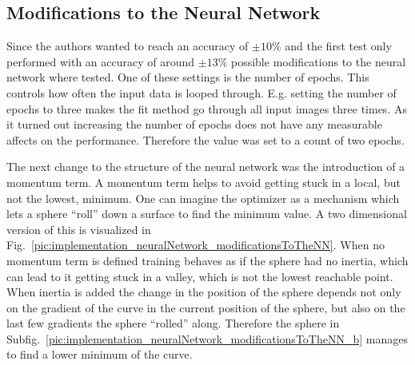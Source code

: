 \newpage

\subsection{Modifications to the Neural Network}
Since the authors wanted to reach an accuracy of $\pm 10\%$ and the first test only performed with an accuracy of around $\pm 13\%$ possible modifications to the neural network where tested. One of these settings is the number of epochs. This controls how often the input data is looped through. E.g. setting the number of epochs to three makes the fit method go through all input images three times. As it turned out increasing the number of epochs does not have any measurable affects on the performance. Therefore the value was set to a count of two epochs.

The next change to the structure of the neural network was the introduction of a momentum term. A momentum term helps to avoid getting stuck in a local, but not the lowest, minimum. One can imagine the optimizer as a mechanism which lets a sphere ``roll'' down a surface to find the minimum value. A two dimensional version of this is visualized in Fig.~\ref{pic:implementation_neuralNetwork_modificationsToTheNN}. When no momentum term is defined training behaves as if the sphere had no inertia, which can lead to it getting stuck in a valley, which is not the lowest reachable point. When inertia is added the change in the position of the sphere depends not only on the gradient of the curve in the current position of the sphere, but also on the last few gradients the sphere ``rolled'' along. Therefore the sphere in Subfig.~\ref{pic:implementation_neuralNetwork_modificationsToTheNN_b} manages to find a lower minimum of the curve.

